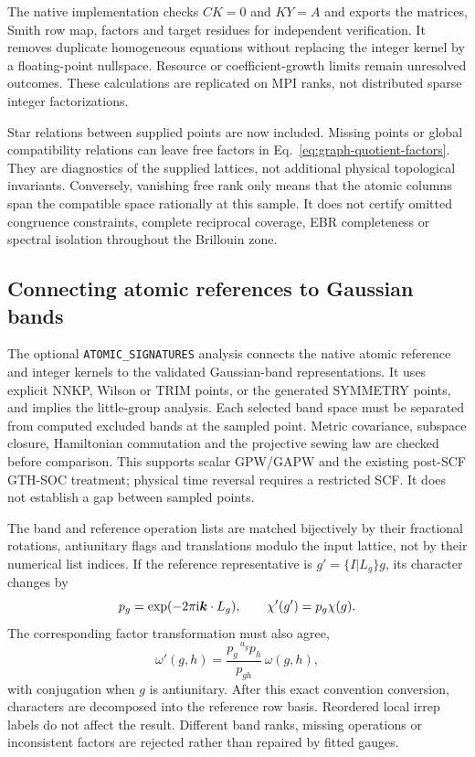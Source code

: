 The native implementation checks $CK=0$ and $KY=A$ and exports
the matrices, Smith row map, factors and target residues for
independent verification. It removes duplicate homogeneous equations
without replacing the integer kernel by a floating-point nullspace.
Resource or coefficient-growth limits remain unresolved outcomes.
These calculations are replicated on MPI ranks, not distributed
sparse integer factorizations.

Star relations between supplied points are now included. Missing
points or global compatibility relations
can leave free factors in Eq.~\eqref{eq:graph-quotient-factors}.
They are diagnostics of the supplied lattices, not additional physical
topological invariants. Conversely, vanishing free rank only means
that the atomic columns span the compatible space rationally at this
sample. It does not certify omitted congruence constraints, complete
reciprocal coverage, EBR completeness or spectral isolation throughout
the Brillouin zone.

\subsection{Connecting atomic references to Gaussian bands}
The optional \texttt{ATOMIC\_SIGNATURES} analysis connects the native
atomic reference and integer kernels to the validated Gaussian-band
representations. It uses explicit NNKP, Wilson or TRIM points, or the
generated SYMMETRY points, and implies the little-group analysis.
Each selected band space must be separated from computed excluded
bands at the sampled point. Metric covariance, subspace closure,
Hamiltonian commutation and the projective sewing law are checked
before comparison. This supports scalar GPW/GAPW and the existing
post-SCF GTH-SOC treatment; physical time reversal requires a restricted
SCF. It does not establish a gap between sampled points.

The band and reference operation lists are matched bijectively by
their fractional rotations, antiunitary flags and translations modulo
the input lattice, not by their numerical list indices. If the
reference representative is $g'=\{I|L_g\}g$, its character changes by
\begin{equation}
 p_g=\exp(-2\pi\mathrm{i}\bm{k}\cdot L_g),\qquad
 \chi'(g')=p_g\chi(g).
\end{equation}
The corresponding factor transformation must also agree,
\begin{equation}
 \omega'(g,h)=\frac{p_g\,{}^{a_g}p_h}{p_{gh}}\,\omega(g,h),
\end{equation}
with conjugation when $g$ is antiunitary. After this exact convention
conversion, characters are decomposed into the reference row basis.
Reordered local irrep labels do not affect the result. Different band
ranks, missing operations or inconsistent factors are rejected rather
than repaired by fitted gauges.

